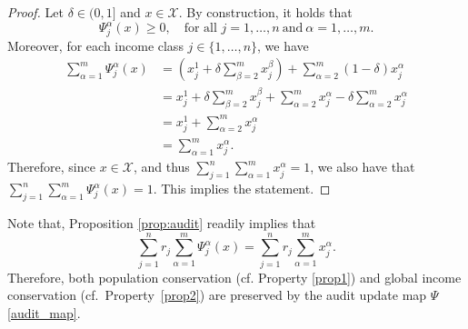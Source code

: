 \documentclass[11pt]{article}
\theoremstyle{plain}
\theoremstyle{definition}
\newcommand{\1}{\mathbf{1}}
\begin{document}
\begin{proof}
Let $\delta \in (0,1]$ and $x \in \mathcal{X}$. By construction, it holds that 
\begin{equation*}
    \Psi^\alpha_j(x) \geq 0, \quad \text{for all } j=1,\ldots,n \ \text{and} \ \alpha=1,\ldots,m.
\end{equation*}
Moreover, for each income class $j \in \{1,\ldots,n\}$, we have
\begin{align*}
 \sum_{\alpha=1}^m \Psi_j^\alpha(x)
&= \left(x_j^1 + \delta\sum_{\beta=2}^m x_j^\beta\right) + \sum_{\alpha=2}^m (1-\delta)x_j^\alpha \\
&= x_j^1 + \delta\sum_{\beta=2}^m x_j^\beta + \sum_{\alpha=2}^m x_j^\alpha - \delta\sum_{\alpha=2}^m x_j^\alpha \\
&= x_j^1 + \sum_{\alpha=2}^m x_j^\alpha \\
&= \sum_{\alpha=1}^m x_j^\alpha.
\end{align*}
Therefore, since $x\in \mathcal{X}$, and thus $\sum_{j=1}^n\sum_{\alpha=1}^m x_j^\alpha=1$, we also have that $\sum_{j=1}^n\sum_{\alpha=1}^m \Psi_j^\alpha(x)=1$. This implies the statement.
\end{proof}

Note that, Proposition \ref{prop:audit} readily implies that
\begin{equation*}
\sum_{j=1}^n r_j \sum_{\alpha=1}^m \Psi_j^\alpha(x) = \sum_{j=1}^n r_j \sum_{\alpha=1}^m x_j^\alpha.
\end{equation*}
Therefore, both population conservation (cf. Property \ref{prop1}) and global income conservation (cf.~Property~\ref{prop2}) are preserved by the audit update map $\Psi$ \eqref{audit_map}.
\end{document}

